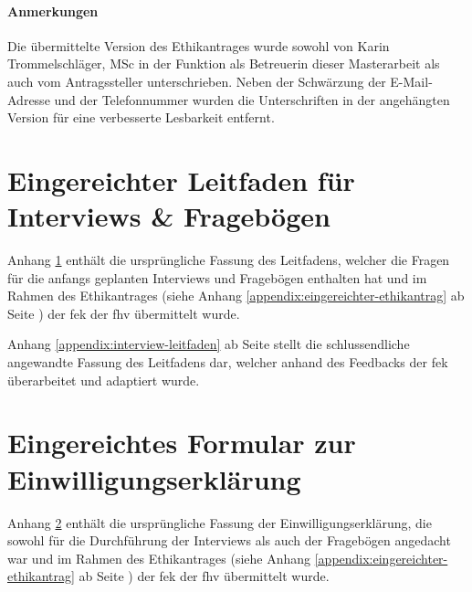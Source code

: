 \documentclass[a4paper,12pt,twoside]{scrreprt}
\begin{document}
\subsubsection*{Anmerkungen}
\label{appendix:anmerkungen-eingereichter-ethikantrag}
Die übermittelte Version des Ethikantrages wurde sowohl von Karin Trommelschläger, MSc in der Funktion als Betreuerin dieser Masterarbeit als auch vom Antragssteller unterschrieben. Neben der Schwärzung der E-Mail-Adresse und der Telefonnummer wurden die Unterschriften in der angehängten Version für eine verbesserte Lesbarkeit entfernt.



\chapter{Eingereichter Leitfaden für Interviews \& Fragebögen}
\label{appendix:ursprünglicher-leitfaden}

Anhang \ref{appendix:ursprünglicher-leitfaden} enthält die ursprüngliche Fassung des Leitfadens, welcher die Fragen für die anfangs geplanten Interviews und Fragebögen enthalten hat und im Rahmen des Ethikantrages (siehe Anhang \ref{appendix:eingereichter-ethikantrag} ab Seite \pageref{appendix:eingereichter-ethikantrag}) der \acl{fek} der \acl{fhv} übermittelt wurde.

\medskip

Anhang \ref{appendix:interview-leitfaden} ab Seite \pageref{appendix:interview-leitfaden} stellt die schlussendliche angewandte Fassung des Leitfadens dar, welcher anhand des Feedbacks der \ac{fek} überarbeitet und adaptiert wurde.



\chapter{Eingereichtes Formular zur Einwilligungserklärung}
\label{appendix:ursprüngliches-informed-consent-formular}

Anhang \ref{appendix:ursprüngliches-informed-consent-formular} enthält die ursprüngliche Fassung der Einwilligungserklärung, die sowohl für die Durchführung der Interviews als auch der Fragebögen angedacht war und im Rahmen des Ethikantrages (siehe Anhang \ref{appendix:eingereichter-ethikantrag} ab Seite \pageref{appendix:eingereichter-ethikantrag}) der \acl{fek} der \acl{fhv} übermittelt wurde.
\end{document}
